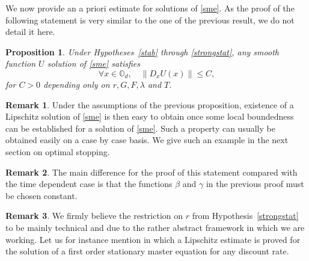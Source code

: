 \documentclass[10pt]{amsart}
\newtheorem{Prop}{Proposition}[section]
\theoremstyle{definition}
\newtheorem{Rem}{Remark}[section]
\begin{document}
We now provide an a priori estimate for solutions of \eqref{sme}. As the proof of the following statement is very similar to the one of the previous result, we do not detail it here.
\begin{Prop}\label{existstat}
Under Hypotheses~\ref{stab} through \ref{strongstat}, any smooth function $U$ solution of \eqref{sme} satisfies
\begin{equation*}
\forall x \in \mathbb{O}_d,\quad \|D_xU(x)\| \leq C,
\end{equation*}
for $C > 0$ depending only on $r,G,F,\lambda$ and $T$.
\end{Prop}
\begin{Rem}\label{rembound}
Under the assumptions of the previous proposition, existence of a Lipschitz solution of \eqref{sme} is then easy to obtain once some local boundedness can be established for a solution of \eqref{sme}. Such a property can usually be obtained easily on a case by case basis. We give such an example in the next section on optimal stopping.
\end{Rem}
\begin{Rem}
The main difference for the proof of this statement compared with the time dependent case is that the functions $\beta$ and $\gamma$ in the previous proof must be chosen constant.
\end{Rem}
\begin{Rem}
We firmly believe the restriction on $r$ from Hypothesis~\ref{strongstat} to be mainly technical and due to the rather abstract framework in which we are working. Let us for instance mention \cite{cardaliaguet2019long} in which a Lipschitz estimate is proved for the solution of a first order stationary master equation for any discount rate.
\end{Rem}
\end{document}
